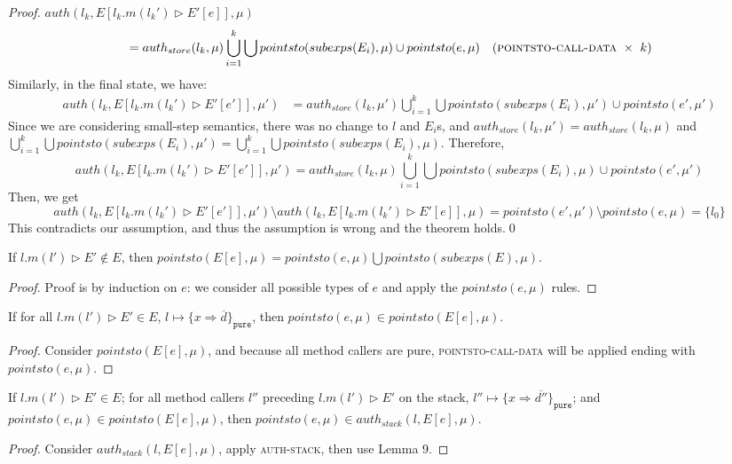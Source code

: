 \documentclass{llncs}
\newcommand{\keywadj}[1]{\mathtt{#1}}
\begin{document}
\begin{proof}
\noindent$auth(l_k, E[l_k.m(l_k') \rhd E'[e]], \mu)$
\vspace{-7pt}
\begin{align*}
&= auth_{store}(l_k, \mu) \bigcup^{k}_{i = 1} \bigcup pointsto(subexps(E_i), \mu) \cup pointsto(e, \mu) & (\textsc{pointsto-call-data}~\times~k)
\end{align*}
Similarly, in the final state, we have:
\begin{align*}
auth(l_k, E[l_k.m(l_k') \rhd E'[e']], \mu') &= auth_{store}(l_k, \mu') \bigcup^{k}_{i = 1} \bigcup pointsto(subexps(E_i), \mu') \cup pointsto(e', \mu')
\end{align*}
Since we are considering small-step semantics, there was no change to $l$ and $E_i$s, and $auth_{store}(l_k, \mu') = auth_{store}(l_k, \mu)$ and $\bigcup^{k}_{i = 1} \bigcup pointsto(subexps(E_i), \mu') = \bigcup^{k}_{i = 1} \bigcup pointsto(subexps(E_i), \mu)$. Therefore,
\[
auth(l_k, E[l_k.m(l_k') \rhd E'[e']], \mu') = auth_{store}(l_k, \mu) \bigcup^{k}_{i = 1} \bigcup pointsto(subexps(E_i), \mu) \cup pointsto(e', \mu')
\]
Then, we get
\[
auth(l_k, E[l_k.m(l_k') \rhd E'[e']], \mu') \setminus auth(l_k, E[l_k.m(l_k') \rhd E'[e]], \mu) = pointsto(e', \mu') \setminus pointsto(e, \mu) = \{ l_0 \}
\]
This contradicts our assumption, and thus the assumption is wrong and the theorem holds.\qed
\end{proof}

\begin{lemma}
If $l.m(l') \rhd E' \not\in E$, then $pointsto(E[e], \mu) = pointsto(e, \mu) \bigcup pointsto(subexps(E), \mu)$.
\end{lemma}

\begin{proof}
Proof is by induction on $e$: we consider all possible types of $e$ and apply the $pointsto(e, \mu)$ rules.
\end{proof}

\begin{lemma}
If for all $l.m(l') \rhd E' \in E$, $l \mapsto \{ x \Rightarrow \overline{d} \}_{\keywadj{pure}}$, then $pointsto(e, \mu) \in pointsto(E[e], \mu)$.
\end{lemma}

\begin{proof}
Consider $pointsto(E[e], \mu)$, and because all method callers are pure, \textsc{pointsto-call-data} will be applied ending with $pointsto(e, \mu)$.
\end{proof}

\begin{lemma}
If $l.m(l') \rhd E' \in E$; for all method callers $l''$ preceding $l.m(l') \rhd E'$ on the stack, $l'' \mapsto \{ x \Rightarrow \overline{d''} \}_{\keywadj{pure}}$; and $pointsto(e, \mu) \in pointsto(E[e], \mu)$, then $pointsto(e, \mu) \in auth_{stack}(l, E[e], \mu)$.
\end{lemma}

\begin{proof}
Consider $auth_{stack}(l, E[e], \mu)$, apply \textsc{auth-stack}, then use Lemma 9.
\end{proof}





\end{document}
